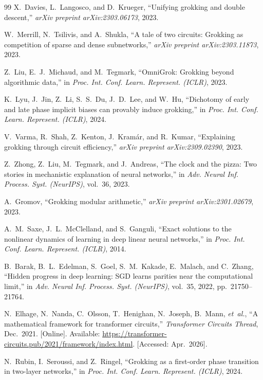 \documentclass[12pt,openany,a4paper]{book}
\begin{document}
{\begin{thebibliography}{99}
X.~Davies, L.~Langosco, and D.~Krueger,
``Unifying grokking and double descent,''
\textit{arXiv preprint arXiv:2303.06173}, 2023.

W.~Merrill, N.~Tsilivis, and A.~Shukla,
``A tale of two circuits: Grokking as competition of sparse and
dense subnetworks,''
\textit{arXiv preprint arXiv:2303.11873}, 2023.

Z.~Liu, E.~J.~Michaud, and M.~Tegmark,
``OmniGrok: Grokking beyond algorithmic data,''
in \textit{Proc. Int. Conf. Learn. Represent. (ICLR)}, 2023.

K.~Lyu, J.~Jin, Z.~Li, S.~S.~Du, J.~D.~Lee, and W.~Hu,
``Dichotomy of early and late phase implicit biases can provably
induce grokking,''
in \textit{Proc. Int. Conf. Learn. Represent. (ICLR)}, 2024.

V.~Varma, R.~Shah, Z.~Kenton, J.~Kram\'{a}r, and R.~Kumar,
``Explaining grokking through circuit efficiency,''
\textit{arXiv preprint arXiv:2309.02390}, 2023.

Z.~Zhong, Z.~Liu, M.~Tegmark, and J.~Andreas,
``The clock and the pizza: Two stories in mechanistic explanation
of neural networks,''
in \textit{Adv. Neural Inf. Process. Syst. (NeurIPS)},
vol.~36, 2023.

A.~Gromov,
``Grokking modular arithmetic,''
\textit{arXiv preprint arXiv:2301.02679}, 2023.

A.~M.~Saxe, J.~L.~McClelland, and S.~Ganguli,
``Exact solutions to the nonlinear dynamics of learning in deep
linear neural networks,''
in \textit{Proc. Int. Conf. Learn. Represent. (ICLR)}, 2014.

B.~Barak, B.~L.~Edelman, S.~Goel, S.~M.~Kakade, E.~Malach, and
C.~Zhang, ``Hidden progress in deep learning: SGD learns parities
near the computational limit,'' in \textit{Adv. Neural Inf. Process.
Syst. (NeurIPS)}, vol.~35, 2022, pp.~21750--21764.

N.~Elhage, N.~Nanda, C.~Olsson, T.~Henighan, N.~Joseph, B.~Mann,
\textit{et~al.}, ``A mathematical framework for transformer
circuits,''
\textit{Transformer Circuits Thread}, Dec.~2021.
[Online]. Available:
\url{https://transformer-circuits.pub/2021/framework/index.html}.
[Accessed: Apr.~2026].

N.~Rubin, I.~Seroussi, and Z.~Ringel,
``Grokking as a first-order phase transition in two-layer
networks,''
in \textit{Proc. Int. Conf. Learn. Represent. (ICLR)}, 2024.


\end{thebibliography}}
\end{document}

